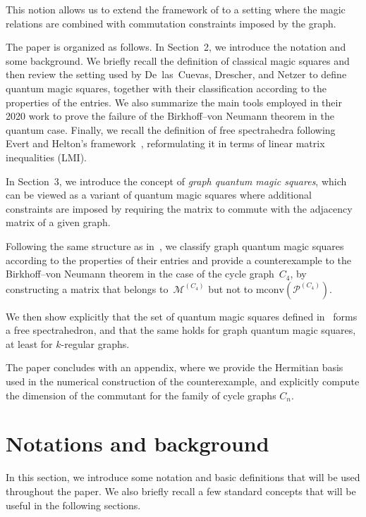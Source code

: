 \documentclass[11pt, a4paper]{article}
\theoremstyle{plain}
\theoremstyle{definition}
\theoremstyle{remark}
\begin{document}
This notion allows us to extend the framework of \cite{DDN20} to a setting where the magic relations are combined with commutation constraints imposed by the graph.

\medskip

The paper is organized as follows.
In Section~2, we introduce the notation and some background.
We briefly recall the definition of classical magic squares and then review the setting used by De~las~Cuevas, Drescher, and Netzer to define quantum magic squares, together with their classification according to the properties of the entries.
We also summarize the main tools employed in their 2020 work to prove the failure of the Birkhoff--von Neumann theorem in the quantum case.
Finally, we recall the definition of free spectrahedra following Evert and Helton’s framework~\cite{EH19}, reformulating it in terms of linear matrix inequalities (LMI).

In Section~3, we introduce the concept of \emph{graph quantum magic squares}, 
which can be viewed as a variant of quantum magic squares where additional constraints 
are imposed by requiring the matrix to commute with the adjacency matrix of a given graph.

 
Following the same structure as in~\cite{DDN20}, we classify graph quantum 
magic squares according to the properties of their entries and provide a counterexample 
to the Birkhoff--von Neumann theorem in the case of the cycle graph~\(C_4\), 
by constructing a matrix that belongs to~\(\mathcal{M}^{(C_4)}\) but not to 
\(\mathrm{mconv}(\mathcal{P}^{(C_4)})\).

We then show explicitly that the set of quantum magic squares defined in~\cite{DDN20} forms a free spectrahedron, and that the same holds for graph quantum magic squares, at least for \(k\)-regular graphs.

The paper concludes with an appendix, where we provide the Hermitian basis used in the numerical construction of the counterexample, and explicitly compute the dimension of the commutant for the family of cycle graphs \(C_n\).


\section{Notations and background}
In this section, we introduce some notation and basic definitions that will be used throughout the paper.
We also briefly recall a few standard concepts that will be useful in the following sections.
\end{document}
